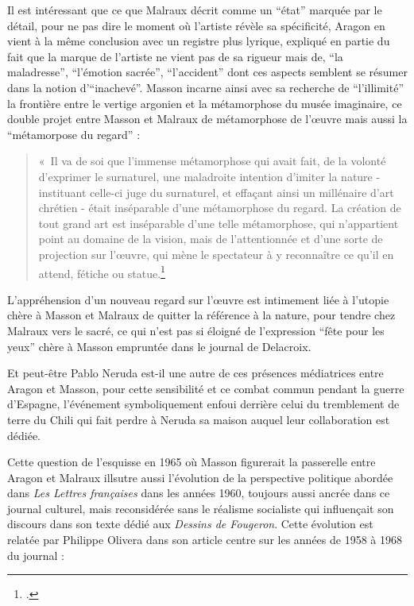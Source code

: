 Il est intéressant que ce que Malraux décrit comme un \enquote{état} marquée par le détail, pour ne pas dire le moment où l'artiste révèle sa spécificité, Aragon en vient à la même conclusion avec un registre plus lyrique, expliqué en partie du fait que la marque de l'artiste ne vient pas de sa rigueur mais de, \enquote{la maladresse}, \enquote{l'émotion sacrée}, \enquote{l'accident} dont ces aspects semblent se résumer dans la notion d'\enquote{inachevé}. Masson incarne ainsi avec sa recherche de \enquote{l'illimité} la frontière entre le vertige argonien et la métamorphose du musée imaginaire, ce double projet entre Masson et Malraux de métamorphose de l'\oe{}uvre mais aussi la \enquote{métamorpose du regard} : 

\begin{quote}
« Il va de soi que l’immense métamorphose qui avait fait, de la volonté d’exprimer le surnaturel, une maladroite intention d’imiter la nature - instituant celle-ci juge du surnaturel, et effaçant ainsi un millénaire d’art chrétien - était inséparable d’une métamorphose du regard. La création de tout grand art est inséparable d’une telle métamorphose, qui n’appartient point au domaine de la vision, mais de l’attentionnée et d’une sorte de projection sur l’\oe{}uvre, qui mène le spectateur à y reconnaître ce qu’il en attend, fétiche ou statue.\footcite{p201}\end{quote}

L'appréhension d'un nouveau regard sur l'\oe{}uvre est intimement liée à l'utopie chère à Masson et Malraux de quitter la référence à la nature, pour tendre chez Malraux vers le sacré, ce qui n'est pas si éloigné de l'expression \enquote{fête pour les yeux} chère à Masson empruntée dans le journal de Delacroix. 

	 Et peut-être Pablo Neruda est-il une autre de ces présences médiatrices entre Aragon et Masson, pour cette sensibilité et ce combat commun pendant la guerre d'Espagne, l'événement symboliquement enfoui derrière celui du tremblement de terre du Chili qui fait perdre à Neruda sa maison auquel leur collaboration est dédiée. 

	Cette question de l'esquisse en 1965 où Masson figurerait la passerelle entre Aragon et Malraux illsutre aussi l'évolution de la perspective politique abordée dans \emph{Les Lettres françaises} dans les années 1960, toujours aussi ancrée dans ce journal culturel, mais reconsidérée sans le réalisme socialiste qui influençait son discours dans son texte dédié aux \emph{Dessins de Fougeron}. Cette évolution est relatée par Philippe Olivera dans son article centre sur les années de 1958 à 1968 du journal : 


